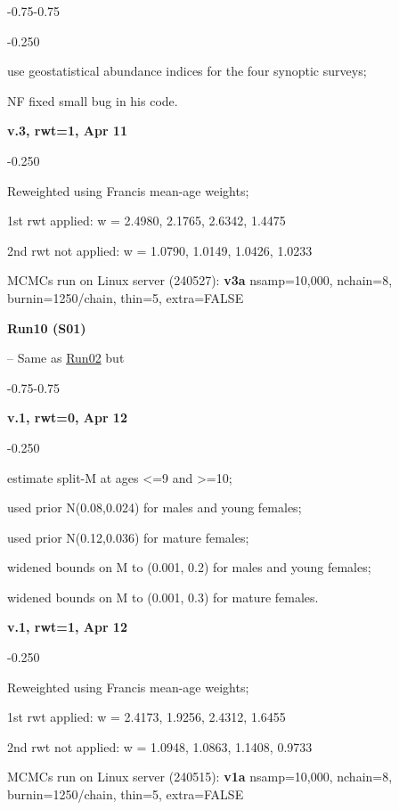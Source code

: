 \begin{itemize_csas}{-0.75}{-0.75}
\begin{itemize_csas}{-0.25}{0}
		\item use geostatistical abundance indices for the four synoptic surveys;
		\item NF fixed small bug in his code.
	\end{itemize_csas}
	\item \textbf{v.3, rwt=1, Apr 11}
	\begin{itemize_csas}{-0.25}{0}
		\item Reweighted using Francis mean-age weights;
		\item 1st rwt applied: w = 2.4980, 2.1765, 2.6342, 1.4475
		\item 2nd rwt not applied: w = 1.0790, 1.0149, 1.0426, 1.0233 
		\item MCMCs run on Linux server (240527): \textbf{v3a} nsamp=10,000, nchain=8, burnin=1250/chain, thin=5, extra=FALSE
	\end{itemize_csas}
\end{itemize_csas}

\hypertarget{R10}{\textbf{Run10 (S01)}} -- Same as \hyperlink{R02}{Run02} but
\begin{itemize_csas}{-0.75}{-0.75}
	\item \textbf{v.1, rwt=0, Apr 12}
	\begin{itemize_csas}{-0.25}{0}
		\item estimate split-M at ages <=9 and >=10;
		\item used prior N(0.08,0.024) for males and young females;
		\item used prior N(0.12,0.036) for mature females;
		\item widened bounds on M to (0.001, 0.2) for males and young females;
		\item widened bounds on M to (0.001, 0.3) for mature females.
	\end{itemize_csas}
	\item \textbf{v.1, rwt=1, Apr 12}
	\begin{itemize_csas}{-0.25}{0}
		\item Reweighted using Francis mean-age weights;
		\item 1st rwt applied: w = 2.4173, 1.9256, 2.4312, 1.6455
		\item 2nd rwt not applied: w = 1.0948, 1.0863, 1.1408, 0.9733
		\item MCMCs run on Linux server (240515): \textbf{v1a} nsamp=10,000, nchain=8, burnin=1250/chain, thin=5, extra=FALSE
	\end{itemize_csas}
\end{itemize_csas}

